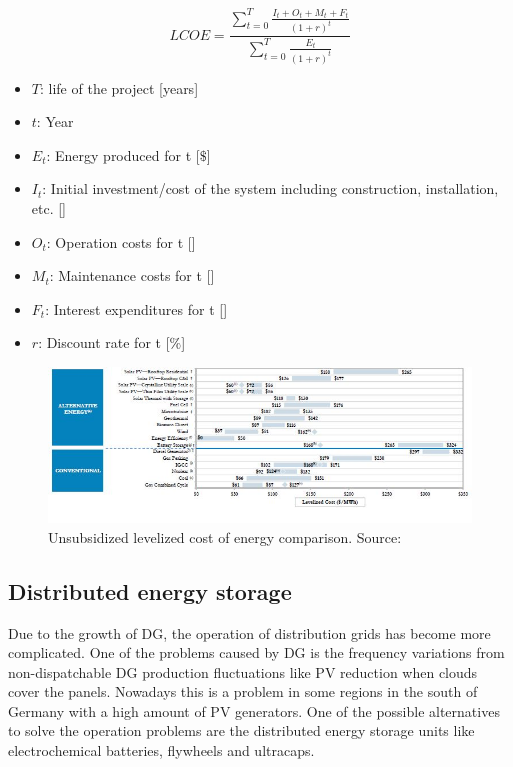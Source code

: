 \documentclass[a4paper,11pt,twoside,openright]{report}
\begin{document}
\begin{equation}
LCOE = \frac{\sum_{t=0}^{T} \frac{I_t+O_t+M_t+F_t}{(1+r)^t}}{\sum_{t=0}^{T} \frac{E_t}{(1+r)^t}}
\label{eq:LCOE}
\end{equation}

\begin{itemize}
	\item $T$: life of the project [years]
	\item $t$: Year
	\item $E_t$: Energy produced for t [$\$$]
	\item $I_t$: Initial investment/cost of the system including construction, installation, etc. [\textdollar]
	\item $O_t$: Operation costs for t [\textdollar]
	\item $M_t$: Maintenance costs for t [\textdollar]
	\item $F_t$: Interest expenditures for t [\textdollar]
	\item $r$: Discount rate for t [$\%$]
\end{itemize}

\begin{figure}[h!]
	\centering
	\includegraphics[scale=0.7]{figures/Captura_LCOE2}
	\caption{Unsubsidized levelized cost of energy comparison. Source: \cite{Lazard2014}}
\end{figure}

\subsection{Distributed energy storage}

Due to the growth of DG, the operation of distribution grids has become more complicated. One of the problems caused by DG is the frequency variations from non-dispatchable DG production fluctuations like PV reduction when clouds cover the panels. Nowadays this is a problem in some regions in the south of Germany with a high amount of PV generators.
One of the possible alternatives to solve the operation problems are the distributed energy storage units like electrochemical batteries, flywheels and ultracaps.
\end{document}

